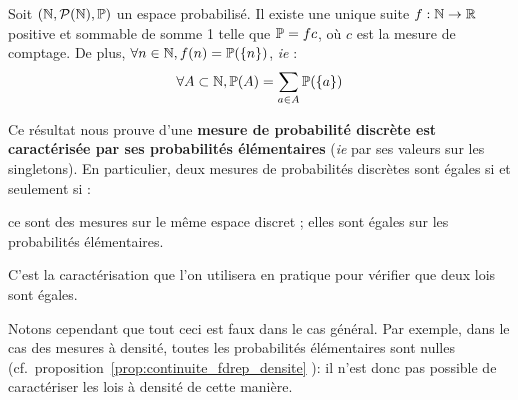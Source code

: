 \documentclass[../integ-proba.tex]{subfiles}
\begin{document}
    \begin{thm}
        Soit $\left(\mathbb{N}, \mathcal{P}(\mathbb{N}), \mathbb{P} \right)$ un espace probabilisé.
        Il existe une unique suite $f:\mathbb{N} \rightarrow \mathbb{R}$ positive et sommable de somme 1 telle que $\mathbb{P} = f c$, où $c$ est la mesure de comptage.
        De plus, $\forall n \in \mathbb{N}, f(n)=\mathbb{P}(\left\{n\right\})$, \textit{ie} :
        \begin{displaymath}
            \forall A \subset \mathbb{N}, \mathbb{P}(A) = \sum_{a \in A} \mathbb{P}(\left\{ a \right\})
        \end{displaymath}
    \end{thm}

    \begin{rem}
        Ce résultat nous prouve d'une \textbf{mesure de probabilité discrète est caractérisée par ses probabilités élémentaires} (\textit{ie} par ses valeurs sur les singletons).
        En particulier, deux mesures de probabilités discrètes sont égales si et seulement si :
        \begin{itemize}
            \itemb ce sont des mesures sur le même espace discret ;
            \itemb elles sont égales sur les probabilités élémentaires.
        \end{itemize}
        C'est la caractérisation que l'on utilisera en pratique pour vérifier que deux lois sont égales.

        Notons cependant que tout ceci est faux dans le cas général.
        Par exemple, dans le cas des mesures à densité, toutes les probabilités élémentaires sont nulles (cf.\ proposition~\ref{prop:continuite_fdrep_densite} ): il n'est donc pas possible de caractériser les lois à densité de cette manière.
    \end{rem}

\end{document}
